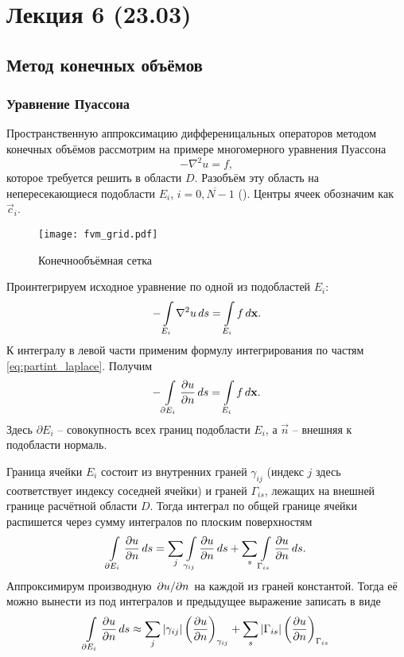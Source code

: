 \section{Лекция 6 (23.03)}

\subsection{Метод конечных объёмов}
\subsubsection{Уравнение Пуассона}
Пространственную аппроксимацию дифференицальных операторов
методом конечных объёмов рассмотрим на примере многомерного уравнения Пуассона
\begin{equation}
\label{eq:fvm_pois}
-\nabla^2 u = f,
\end{equation}
которое требуется решить в области $D$. Разобъём эту область
на непересекающиеся подобласти $E_i$, $i = \overline{0, N-1}$ ().
Центры ячеек обозначим как $\vec c_i$.

\begin{figure}[h!]
\centering
\texttt{[image: fvm\_grid.pdf]}
\caption{Конечнообъёмная сетка}
\label{fig:fvm_grid}
\end{figure}

Проинтегрируем исходное уравнение
по одной из подобластей $E_i$:
\begin{equation*}
-\arint{\nabla^2 u}{E_i}{s} = \arint{f}{E_i}{\vec x}.
\end{equation*}
К интегралу в левой части применим формулу интегрирования по частям \cref{eq:partint_laplace}. Получим
\begin{equation}
\label{eq:fvm_pois_int}
-\arint{\dfr{u}{n}}{\partial E_i}{s} = \arint{f}{E_i}{\vec x}.
\end{equation}
Здесь $\partial E_i$ -- совокупность всех границ подобласти $E_i$,
а $\vec n$ -- внешняя к подобласти нормаль.

Граница ячейки $E_i$ состоит из внутренних граней $\gamma_{ij}$ (индекс $j$ здесь
соответствует индексу соседней ячейки)
и граней $\Gamma_{is}$, лежащих на внешней границе расчётной области $D$.
Тогда интеграл по общей границе ячейки распишется через сумму интегралов по плоским поверхностям
$$
\arint{\dfr{u}{n}}{\partial E_i}{s} = \sum_j\arint{\dfr{u}{n}}{\gamma_{ij}}{s} + \sum_s\arint{\dfr{u}{n}}{\Gamma_{is}}{s}.
$$
Аппроксимирум производную $\dsfr{u}{n}$ на каждой из граней константой.
Тогда её можно вынести из под интегралов и предыдущее выражение записать в виде
\begin{equation}
\label{eq:fvm_gamma_integral}
\arint{\dfr{u}{n}}{\partial E_i}{s} \approx
\sum_j
    \left|
        \gamma_{ij}
    \right|
    \left(
        \dfr{u}{n}
    \right)_{\gamma_{ij}}
+\sum_s
    \left|
        \Gamma_{is}
    \right|
    \left(
        \dfr{u}{n}
    \right)_{\Gamma_{is}}
\end{equation}

